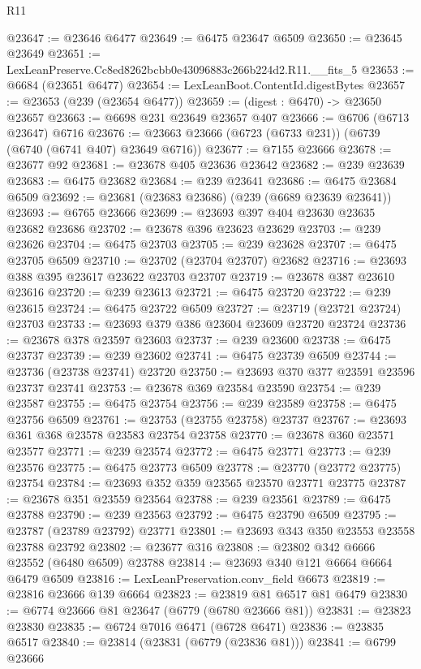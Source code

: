 \begin{lexlean}{R11}
\begin{coremodule}
@23647 := @23646 @6477
@23649 := @6475 @23647 @6509
@23650 := @23645 @23649
@23651 := LexLeanPreserve.Cc8ed8262bcbb0e43096883c266b224d2.R11.__fits_5
@23653 := @6684 (@23651 @6477)
@23654 := LexLeanBoot.ContentId.digestBytes
@23657 := @23653 (@239 (@23654 @6477))
@23659 := (digest : @6470) -> @23650 @23657
@23663 := @6698 @231 @23649 @23657 @407
@23666 := @6706 (@6713 @23647) @6716
@23676 := @23663 @23666 (@6723 (@6733 @231)) (@6739 (@6740 (@6741 @407) @23649 @6716))
@23677 := @7155 @23666
@23678 := @23677 @92
@23681 := @23678 @405 @23636 @23642
@23682 := @239 @23639
@23683 := @6475 @23682
@23684 := @239 @23641
@23686 := @6475 @23684 @6509
@23692 := @23681 (@23683 @23686) (@239 (@6689 @23639 @23641))
@23693 := @6765 @23666
@23699 := @23693 @397 @404 @23630 @23635 @23682 @23686
@23702 := @23678 @396 @23623 @23629
@23703 := @239 @23626
@23704 := @6475 @23703
@23705 := @239 @23628
@23707 := @6475 @23705 @6509
@23710 := @23702 (@23704 @23707) @23682
@23716 := @23693 @388 @395 @23617 @23622 @23703 @23707
@23719 := @23678 @387 @23610 @23616
@23720 := @239 @23613
@23721 := @6475 @23720
@23722 := @239 @23615
@23724 := @6475 @23722 @6509
@23727 := @23719 (@23721 @23724) @23703
@23733 := @23693 @379 @386 @23604 @23609 @23720 @23724
@23736 := @23678 @378 @23597 @23603
@23737 := @239 @23600
@23738 := @6475 @23737
@23739 := @239 @23602
@23741 := @6475 @23739 @6509
@23744 := @23736 (@23738 @23741) @23720
@23750 := @23693 @370 @377 @23591 @23596 @23737 @23741
@23753 := @23678 @369 @23584 @23590
@23754 := @239 @23587
@23755 := @6475 @23754
@23756 := @239 @23589
@23758 := @6475 @23756 @6509
@23761 := @23753 (@23755 @23758) @23737
@23767 := @23693 @361 @368 @23578 @23583 @23754 @23758
@23770 := @23678 @360 @23571 @23577
@23771 := @239 @23574
@23772 := @6475 @23771
@23773 := @239 @23576
@23775 := @6475 @23773 @6509
@23778 := @23770 (@23772 @23775) @23754
@23784 := @23693 @352 @359 @23565 @23570 @23771 @23775
@23787 := @23678 @351 @23559 @23564
@23788 := @239 @23561
@23789 := @6475 @23788
@23790 := @239 @23563
@23792 := @6475 @23790 @6509
@23795 := @23787 (@23789 @23792) @23771
@23801 := @23693 @343 @350 @23553 @23558 @23788 @23792
@23802 := @23677 @316
@23808 := @23802 @342 @6666 @23552 (@6480 @6509) @23788
@23814 := @23693 @340 @121 @6664 @6664 @6479 @6509
@23816 := LexLeanPreservation.conv_field @6673
@23819 := @23816 @23666 @139 @6664
@23823 := @23819 @81 @6517 @81 @6479
@23830 := @6774 @23666 @81 @23647 (@6779 (@6780 @23666 @81))
@23831 := @23823 @23830
@23835 := @6724 @7016 @6471 (@6728 @6471)
@23836 := @23835 @6517
@23840 := @23814 (@23831 (@6779 (@23836 @81)))
@23841 := @6799 @23666

\end{coremodule}
\end{lexlean}
